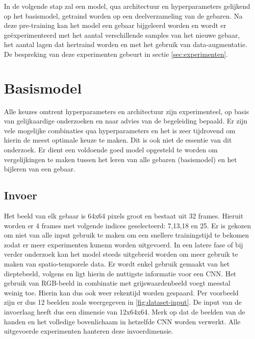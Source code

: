 \npar In de volgende stap zal een model, qua architectuur en hyperparameters gelijkend op het basismodel, getraind worden op een deelverzameling van de gebaren. Na deze pre-training kan het model een gebaar bijgeleerd worden en wordt er ge\"experimenteerd met het aantal verschillende samples van het nieuwe gebaar, het aantal lagen dat hertraind worden en met het gebruik van data-augmentatie. De bespreking van deze experimenten gebeurt in sectie \ref{sec:experimenten}.

\section{Basismodel}\label{sec:basismodel}
Alle keuzes omtrent hyperparameters en architectuur zijn experimenteel, op basis van gelijkaardige onderzoeken en naar advies van de begeleiding bepaald. Er zijn vele mogelijke combinaties qua hyperparameters en het is zeer tijdrovend om hierin de meest optimale keuze te maken. Dit is ook niet de essentie van dit onderzoek. Er dient een voldoende goed model opgesteld te worden om vergelijkingen te maken tussen het leren van alle gebaren (basismodel) en het bijleren van een gebaar. 
\subsection{Invoer}
Het beeld van elk gebaar is 64x64 pixels groot en bestaat uit 32 frames. Hieruit worden er 4 frames met volgende indices geselecteerd: 7,13,18 en 25. Er is gekozen om niet van alle input gebruik te maken om een snellere trainingstijd te bekomen zodat er meer experimenten kunenn worden uitgevoerd. In een latere fase of bij verder onderzoek kan het model steeds uitgebreid worden om meer gebruik te maken van spatio-temporele data.
\npar Er wordt enkel gebruik gemaakt van het dieptebeeld, volgens \cite{lionel} en \cite{wu_deep_2014} ligt hierin de nuttigste informatie voor een CNN. Het gebruik van RGB-beeld in combinatie met grijswaardenbeeld voegt meestal weinig toe. Hierin kan dus ook weer rekentijd worden gespaard.
\npar Per voorbeeld zijn er dus 12 beelden zoals weergegeven in \ref{fig:dataset-input}. De input van de invoerlaag heeft dus een dimensie van 12x64x64. Merk op dat de beelden van de handen en het volledige bovenlichaam in hetzelfde CNN worden verwerkt. Alle uitgevoerde experimenten hanteren deze invoerdimensie.

